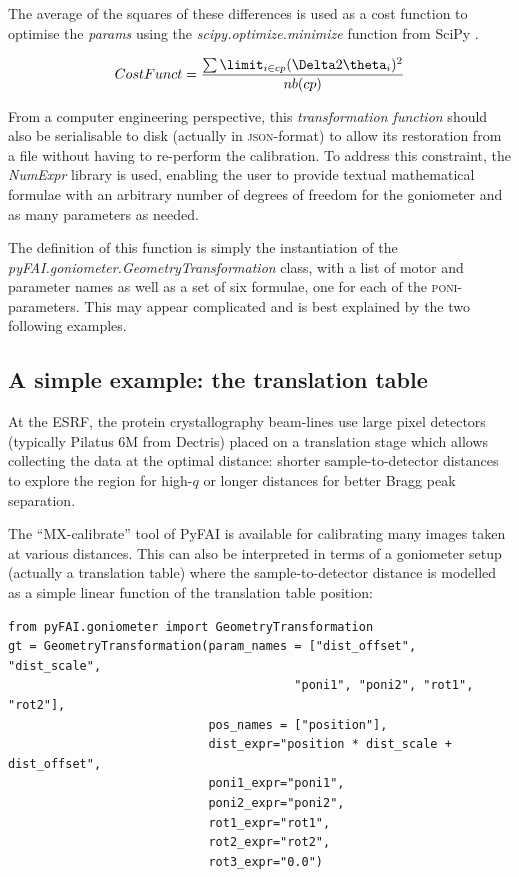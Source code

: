 \documentclass[preprint]{iucr}              %
\begin{document}
The average of the squares of these differences is used as a cost function
to optimise the \textit{params} using the \textit{scipy.optimize.minimize}
function from SciPy \cite{scipy}.

$$
CostFunct = \frac{ \sum\limit_{i \in cp} {(\Delta 2\theta_i)^2}} {nb(cp)} 
$$

From a computer engineering perspective, this \textit{transformation function}
should also be serialisable to disk (actually in \textsc{json}-format) to allow
its restoration from a file without having to re-perform the calibration. 
To address this constraint, the \textit{NumExpr} library \cite{numexpr} is
used, enabling the user to provide textual mathematical formulae with
an arbitrary number of degrees of freedom for the goniometer and as many parameters
as needed.

The definition of this function is simply the instantiation of the
\textit{pyFAI.goniometer.GeometryTransformation} class, with a list of
motor and parameter names as well as a set of six formulae, one for each of
the \textsc{poni}-parameters.
This may appear complicated and is best explained by the two following examples.

\subsection{A simple example: the translation table}

At the  ESRF, the protein crystallography beam-lines use large pixel detectors
(typically Pilatus 6M from Dectris) placed on a translation stage which allows
collecting the data at the optimal distance: shorter sample-to-detector
distances to explore the region for high-$q$ 
or longer distances for better Bragg peak separation.

The ``MX-calibrate'' tool of PyFAI is available for calibrating many images
taken at various distances.
This can also be interpreted in terms of a goniometer setup (actually a
translation table) where the sample-to-detector distance is modelled as a
simple linear function of the translation table position:

\begin{verbatim}
from pyFAI.goniometer import GeometryTransformation
gt = GeometryTransformation(param_names = ["dist_offset", "dist_scale", 
                                        "poni1", "poni2", "rot1", "rot2"],
                            pos_names = ["position"],
                            dist_expr="position * dist_scale + dist_offset", 
                            poni1_expr="poni1",
                            poni2_expr="poni2", 
                            rot1_expr="rot1", 
                            rot2_expr="rot2", 
                            rot3_expr="0.0")
\end{verbatim}
 
\end{document}
